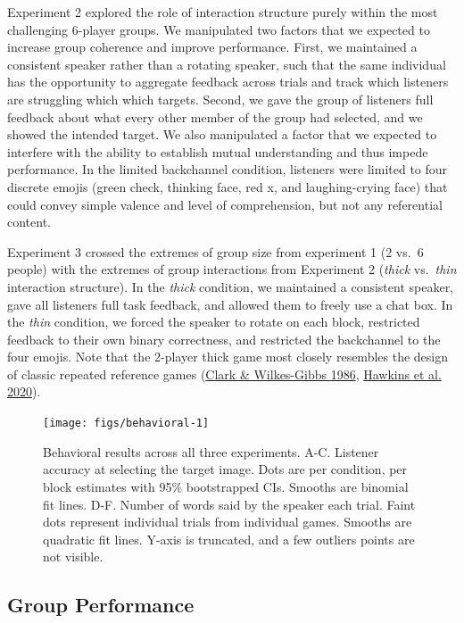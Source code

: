 \documentclass[
  english,
  a4paper,
]{article}
\begin{document}
Experiment 2 explored the role of interaction structure purely within the most challenging 6-player groups.
We manipulated two factors that we expected to increase group coherence and improve performance.
First, we maintained a consistent speaker rather than a rotating speaker, such that the same individual has the opportunity to aggregate feedback across trials and track which listeners are struggling which which targets.
Second, we gave the group of listeners full feedback about what every other member of the group had selected, and we showed the intended target.
We also manipulated a factor that we expected to interfere with the ability to establish mutual understanding and thus impede performance.
In the limited backchannel condition, listeners were limited to four discrete emojis (green check, thinking face, red x, and laughing-crying face) that could convey simple valence and level of comprehension, but not any referential content.

Experiment 3 crossed the extremes of group size from experiment 1 (2 vs.~6 people) with the extremes of group interactions from Experiment 2 (\emph{thick} vs.~\emph{thin} interaction structure).
In the \emph{thick} condition, we maintained a consistent speaker, gave all listeners full task feedback, and allowed them to freely use a chat box.
In the \emph{thin} condition, we forced the speaker to rotate on each block, restricted feedback to their own binary correctness, and restricted the backchannel to the four emojis.
Note that the 2-player thick game most closely resembles the design of classic repeated reference games (\protect\hyperlink{ref-clark1986}{Clark \& Wilkes-Gibbs 1986}, \protect\hyperlink{ref-hawkins2020}{Hawkins et al. 2020}).

\begin{figure}[t!]

{\centering \texttt{[image: figs/behavioral-1]} 

}

\caption{Behavioral results across all three experiments. A-C. Listener accuracy at selecting the target image. Dots are per condition, per block estimates with 95\% bootstrapped CIs. Smooths are binomial fit lines.   D-F. Number of words said by the speaker each trial. Faint dots represent individual trials from individual games. Smooths are quadratic fit lines. Y-axis is truncated, and a few outliers points are not visible. }\label{fig:behavioral}
\end{figure}

\hypertarget{group-performance}{%
\subsection{Group Performance}\label{group-performance}}
\end{document}
